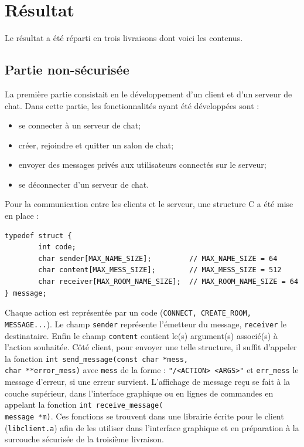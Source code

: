 \documentclass[a4paper,11pt,french]{book}
\begin{document}
\section{Résultat}

Le résultat a été réparti en trois livraisons dont voici les contenus.

\subsection{Partie non-sécurisée}
La première partie consistait en le développement d'un client et d'un serveur de chat. Dans cette partie, les fonctionnalités ayant été développées sont :
\begin{itemize}
\item se connecter à un serveur de chat;
\item créer, rejoindre et quitter un salon de chat;
\item envoyer des messages privés aux utilisateurs connectés sur le serveur;
\item se déconnecter d'un serveur de chat.
\end{itemize}

Pour la communication entre les clients et le serveur, une structure C a été mise en place :

\begin{verbatim}
typedef struct {
        int code;
        char sender[MAX_NAME_SIZE];         // MAX_NAME_SIZE = 64
        char content[MAX_MESS_SIZE];        // MAX_MESS_SIZE = 512
        char receiver[MAX_ROOM_NAME_SIZE];  // MAX_ROOM_NAME_SIZE = 64
} message;
\end{verbatim}

Chaque action est représentée par un code (\verb+CONNECT, CREATE_ROOM, MESSAGE...+). Le champ \verb+sender+ représente l'émetteur du message, \verb+receiver+ le destinataire. Enfin le champ \verb+content+ contient le(s) argument(s) associé(s) à l'action souhaitée. Côté client, pour envoyer une telle structure, il suffit d'appeler la fonction \verb+int send_message(const char *mess,+\\ \verb+char **error_mess)+ avec \verb+mess+ de la forme : \verb+"/<ACTION> <ARGS>"+ et \verb+err_mess+ le message d'erreur, si une erreur survient. L'affichage de message reçu se fait à la couche supérieur, dans l'interface graphique ou en lignes de commandes en appelant la fonction \verb+int receive_message(+\\\verb+message *m)+. Ces fonctions se trouvent dans une librairie écrite pour le client (\verb+libclient.a+) afin de les utiliser dans l'interface graphique et en préparation à la surcouche sécurisée de la troisième livraison. 
\end{document}
